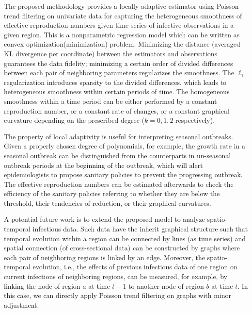 \documentclass[10pt,letterpaper]{article}
\begin{document}
The proposed methodology provides a locally adaptive estimator using Poisson trend filtering on univariate data for capturing the heterogeneous smoothness of effective reproduction numbers given time series of infective observations in a given region. This is a nonparametric regression model which can be written as convex optimization(minimization) problem. Minimizing the distance (averaged KL divergence per coordinate) between the estimators and observations guarantees the data fidelity; minimizing a certain order of divided differences between each pair of neighboring parameters regularizes the smoothness. The $\ell_1$ regularization introduces sparsity to the divided differences, which leads to heterogeneous smoothness within certain periods of time. The homogeneous smoothness within a time period can be either performed by a constant reproduction number, or a constant rate of changes, or a constant graphical curvature depending on the prescribed degree ($k=0,1,2$ respectively). %

The property of local adaptivity is useful for interpreting seasonal outbreaks. Given a properly chosen degree of polynomials, for example, the growth rate in a seasonal outbreak can be distinguished from the counterparts in un-seasonal outbreak periods at the beginning of the outbreak, which will alert epidemiologists to propose sanitary policies to prevent the progressing outbreak. The effective reproduction numbers can be estimated afterwards to check the efficiency of the sanitary policies referring to whether they are below the threshold, their tendencies of reduction, or their graphical curvatures.

A potential future work is to extend the proposed model to analyze spatio-temporal infectious data. Such data have the inherit graphical structure such that temporal evolution within a region can be connected by lines (as time series) and spatial connection (of cross-sectional data) can be constructed by graphs where each pair of neighboring regions is linked by an edge. Moreover, the spatio-temporal evolution, i.e., the effects of previous infectious data of one region on current infections of neighboring regions, can be measured, for example, by linking the node of region $a$ at time $t-1$ to another node of region $b$ at time $t$. 
In this case, we can directly apply Poisson trend filtering on graphs with minor adjustment. %
\end{document}
